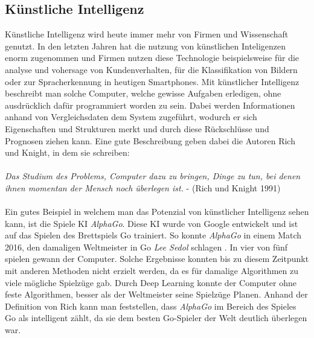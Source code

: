 \documentclass[a4paper,12pt,oneside]{article}
\begin{document}
\subsection{Künstliche Intelligenz}\label{s.ki}
Künstliche Intelligenz wird heute immer mehr von Firmen und Wissenschaft genutzt. In den letzten Jahren hat die nutzung von künstlichen Inteligenzen enorm zugenommen und Firmen nutzen diese Technologie beispielsweise für die analyse und vohersage von Kundenverhalten, für die Klassifikation von Bildern oder zur Spracherkennung in heutigen Smartphones. Mit künstlicher Intelligenz beschreibt man solche Computer, welche gewisse Aufgaben erledigen, ohne ausdrücklich dafür programmiert worden zu sein. Dabei werden Informationen anhand von Vergleichsdaten dem System zugeführt, wodurch er sich Eigenschaften und Strukturen merkt und durch diese Rückschlüsse und Prognosen ziehen kann. Eine gute Beschreibung geben dabei die Autoren Rich und Knight, in dem sie schreiben:\\\\
 \textit{Das Studium des Problems, Computer dazu zu bringen, Dinge zu tun, bei denen ihnen momentan der Mensch noch überlegen ist.} - (Rich und Knight 1991)\\\\
Ein gutes Beispiel in welchem man das Potenzial von künstlicher Intelligenz sehen kann, ist die Spiele KI  \textit{AlphaGo}. Diese KI wurde von Google entwickelt und ist auf das Spielen des Brettspiels Go trainiert. So konnte \textit{AlphaGo} in einem Match 2016, den damaligen Weltmeister in Go \textit{Lee Sedol} schlagen \cite{Alpha2016GO}. In vier von fünf spielen gewann der Computer. Solche Ergebnisse konnten bis zu diesem Zeitpunkt mit anderen Methoden nicht erzielt werden, da es für damalige Algorithmen zu viele mögliche Spielzüge gab. Durch Deep Learning konnte der Computer ohne feste Algorithmen, besser als der Weltmeister seine Spielzüge Planen. Anhand der Definition von Rich kann man feststellen, dass  \textit{AlphaGo}  im Bereich des Spieles Go als intelligent zählt, da sie dem besten Go-Spieler der Welt deutlich überlegen war.
\end{document}
